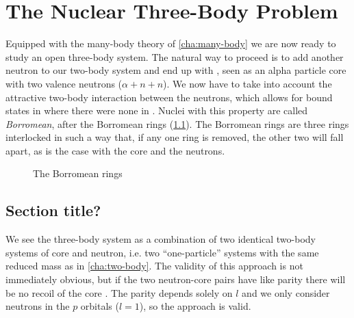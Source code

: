 \documentclass[../main/report.tex]{subfiles}
\begin{document}
\chapter{The Nuclear Three-Body Problem}
\label{cha:three-body}

Equipped with the many-body theory of \cref{cha:many-body} we are now ready to study an open three-body system.
The natural way to proceed is to add another neutron to our two-body  system and end up with , seen as an alpha particle core with two valence neutrons ($\alpha + n + n$).
We now have to take into account the attractive two-body interaction between the neutrons, which allows for bound states in  where there were none in .
Nuclei with this property are called \emph{Borromean}, after the Borromean rings (\cref{fig:borromean}). 
The Borromean rings are three rings interlocked in such a way that, if any one ring is removed, the other two will fall apart, as is the case with the core and the neutrons.

\begin{figure}[h]
  \newcommand{\circdist}{1.2}
  \newcommand{\circrad}{2}
  \centering
  \caption{The Borromean rings}
  \label{fig:borromean}
\end{figure}

\section{Section title?}

We see the three-body system as a combination of two identical two-body systems of core and neutron, i.e. two ``one-particle'' systems with the same reduced mass as in \cref{cha:two-body}.
The validity of this approach is not immediately obvious, but 
if the two neutron-core pairs have like parity there will be no recoil of the core \cite{suzuki}. 
The parity depends solely on $l$ and we only consider neutrons in the $p$ orbitals ($l=1$), so the approach is valid.
\end{document}
